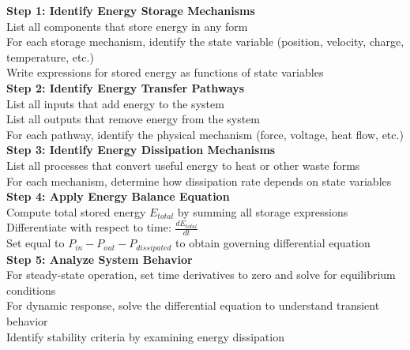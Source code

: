 \begin{algorithm}[htbp]
\DontPrintSemicolon
\SetAlgoLined
{}
\BlankLine
\textcolor{UofSCGurnet}{\textbf{Step 1: Identify Energy Storage Mechanisms}} \\
\quad List all components that store energy in any form \\
\quad For each storage mechanism, identify the state variable (position, velocity, charge, temperature, etc.) \\
\quad Write expressions for stored energy as functions of state variables \\
\BlankLine
\textcolor{UofSCGurnet}{\textbf{Step 2: Identify Energy Transfer Pathways}} \\
\quad List all inputs that add energy to the system \\
\quad List all outputs that remove energy from the system \\
\quad For each pathway, identify the physical mechanism (force, voltage, heat flow, etc.) \\
\BlankLine
\textcolor{UofSCGurnet}{\textbf{Step 3: Identify Energy Dissipation Mechanisms}} \\
\quad List all processes that convert useful energy to heat or other waste forms \\
\quad For each mechanism, determine how dissipation rate depends on state variables \\
\BlankLine
\textcolor{UofSCGurnet}{\textbf{Step 4: Apply Energy Balance Equation}} \\
\quad Compute total stored energy $E_{total}$ by summing all storage expressions \\
\quad Differentiate with respect to time: $\frac{dE_{total}}{dt}$ \\
\quad Set equal to $P_{in} - P_{out} - P_{dissipated}$ to obtain governing differential equation \\
\BlankLine
\textcolor{UofSCGurnet}{\textbf{Step 5: Analyze System Behavior}} \\
\quad For steady-state operation, set time derivatives to zero and solve for equilibrium conditions \\
\quad For dynamic response, solve the differential equation to understand transient behavior \\
\quad Identify stability criteria by examining energy dissipation \\
\BlankLine
\caption{Systematic procedure for analyzing control systems using energy principles. This algorithm applies universally across all engineering disciplines because it derives from the fundamental conservation of energy.}
\label{alg:energy_analysis}
\end{algorithm}

